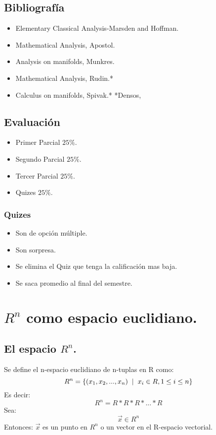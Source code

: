 \documentclass{book}
\begin{document}
\section{Bibliografía}
\begin{itemize}
    \item Elementary Classical Analysis-Marsden and Hoffman.
    \item Mathematical Analysis, Apostol.
    \item Analysis on manifolds, Munkres.
    \item Mathematical Analysis, Rudin.*
    \item Calculus on manifolds, Spivak.*
    *Densos,
\end{itemize}
\section{Evaluación}
\begin{itemize}
    \item Primer Parcial $25\%$.
      \item Segundo Parcial $25\%$.
        \item Tercer Parcial $25\%$.
        \item Quizes $25\%$.
\end{itemize}
\subsection{Quizes}
\begin{itemize}
    \item Son de opción múltiple.
    \item Son sorpresa.
    \item Se elimina el Quiz que tenga la calificación mas baja.
    \item Se saca promedio al final del semestre.

\end{itemize}

\chapter{$R^n$ como espacio euclidiano.}
\section{El espacio $R^n$.}
Se define el n-espacio euclidiano de n-tuplas en R como:
$$R^n=\{(x_{1},x_{2},...,x_{n}) \hspace{0.2cm} | \hspace{0.2cm} x_{i} \in R, 1\leq i\leq n\}$$
Es decir:
$$R^n=R*R*R*...*R$$
Sea:
$$\overrightarrow{x}\in R^n$$ 
Entonces:
$  \overrightarrow{x}$ es un punto en $R^n$ o un vector en el R-espacio vectorial.
\end{document}
